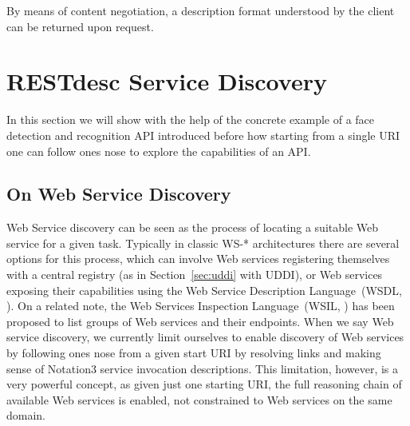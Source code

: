 \documentclass[runningheads,a4paper, twocolumn]{llncs}
\begin{document}
By means of content negotiation, a description format understood by the client can be returned upon request.

\section{RESTdesc Service Discovery} \label{sec:restdesc-discovery}
In this section we will show with the help of the concrete example of a face detection and recognition API introduced before how starting from a single URI one can follow ones nose to explore the capabilities of an API.

\subsection{On Web Service Discovery}
Web Service discovery can be seen as the process of locating a suitable Web service for a given task. Typically in classic WS-* architectures there are several options for this process, which can involve Web services registering themselves with a central registry (as in Section~\ref{sec:uddi} with UDDI), or Web services exposing their capabilities using the Web Service Description Language~(WSDL, \cite{WSDL1, WSDL2}). On a related note, the Web Services Inspection Language~(WSIL, \cite{WSIL}) has been proposed to list groups of Web services and their endpoints. When we say Web service discovery, we currently limit ourselves to enable discovery of Web services by following ones nose from a given start URI by resolving links and making sense of Notation3 service invocation descriptions. This limitation, however, is a very powerful concept, as given just one starting URI, the full reasoning chain of available Web services is enabled, not constrained to Web services on the same domain.
\end{document}
